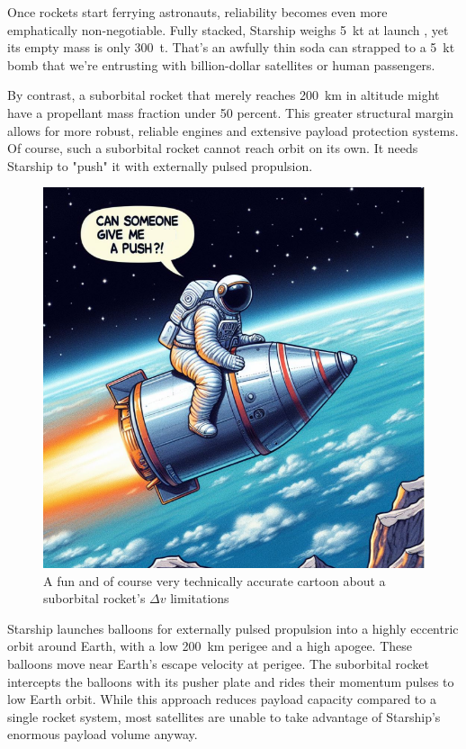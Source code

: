 \documentclass{article}
\begin{document}
{Once rockets start ferrying astronauts, reliability becomes even more emphatically non-negotiable. Fully stacked, Starship weighs \SI{5}{\kilo\tonne} at launch \cite{starship}, yet its empty mass is only \SI{300}{\tonne}. That’s an awfully thin soda can strapped to a \SI{5}{\kilo\tonne} bomb that we're entrusting with billion-dollar satellites or human passengers.

By contrast, a suborbital rocket that merely reaches \SI{200}{\kilo\meter} in altitude might have a propellant mass fraction under 50 percent. This greater structural margin allows for more robust, reliable engines and extensive payload protection systems. Of course, such a suborbital rocket cannot reach orbit on its own.  It needs Starship to "push" it with externally pulsed propulsion.
\begin{figure}[htpb]
    \centering
    \includegraphics[width=0.5\linewidth]{images/suborbital_push_cartoon.png}
    \caption{A fun and of course very technically accurate cartoon about a suborbital rocket's $\Delta v$ limitations}
    \label{fig:suborbital-cartoon}
\end{figure}



Starship launches balloons for externally pulsed propulsion into a highly eccentric orbit around Earth, with a low \SI{200}{\kilo\meter} perigee and a high apogee. These balloons move near Earth’s escape velocity at perigee. The suborbital rocket intercepts the balloons with its pusher plate and rides their momentum pulses to low Earth orbit. While this approach reduces payload capacity compared to a single rocket system, most satellites are unable to take advantage of Starship’s enormous payload volume anyway.

}
\end{document}
